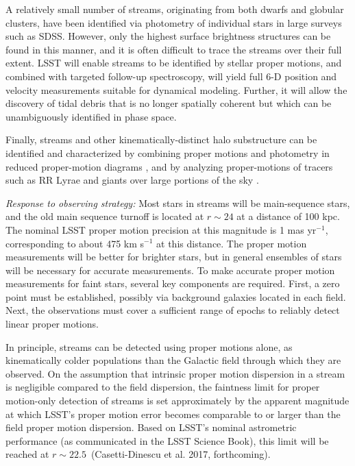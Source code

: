 A relatively small number of streams, originating from both dwarfs and globular clusters, have been identified via photometry
of individual stars in large surveys such as SDSS\@. However, only the highest surface brightness structures can be found
in this manner, and it is often difficult to trace the streams over their full extent. LSST will enable streams to be identified
by stellar proper motions, and combined with targeted follow-up spectroscopy, will yield full 6-D position and velocity measurements suitable for dynamical modeling.
Further, it will allow the discovery of tidal debris that is no longer spatially coherent but which can be unambiguously identified in phase space.

Finally, streams and other kinematically-distinct halo substructure
can be identified and characterized by combining proper motions and
photometry in reduced proper-motion diagrams \citep[e.g.,][]{carlin12},
and by analyzing proper-motions of tracers such as
RR Lyrae and giants over large portions of the sky \citep[e.g.,][]{casettidinescu15}.

{\it Response to observing strategy:} Most stars in streams will be main-sequence stars, and the old main sequence turnoff  is located at $r\sim24$ at a distance of 100 kpc.
The nominal LSST proper motion precision at this magnitude is 1 mas yr$^{-1}$, corresponding to about 475 km s$^{-1}$ at this distance. The proper motion
measurements will be better for brighter stars, but in general ensembles of stars will be necessary for accurate measurements. To make accurate proper motion measurements for faint stars, several key components are required. First, a zero point must be established, possibly via background galaxies located in each field. Next, the observations must cover a sufficient range of epochs to reliably detect linear proper motions.

In principle, streams can be detected using proper motions alone, as
kinematically colder populations than the Galactic field through which
they are observed. On the assumption that intrinsic proper motion
dispersion in a stream is negligible compared to the field dispersion,
the faintness limit for proper motion-only detection of streams is set
approximately by the apparent magnitude at which LSST's proper motion
error becomes comparable to or larger than the field proper motion
dispersion. Based on LSST's nominal astrometric performance (as
communicated in the LSST Science Book), this limit will be reached at
$r \sim 22.5$~(Casetti-Dinescu et al. 2017, forthcoming).

